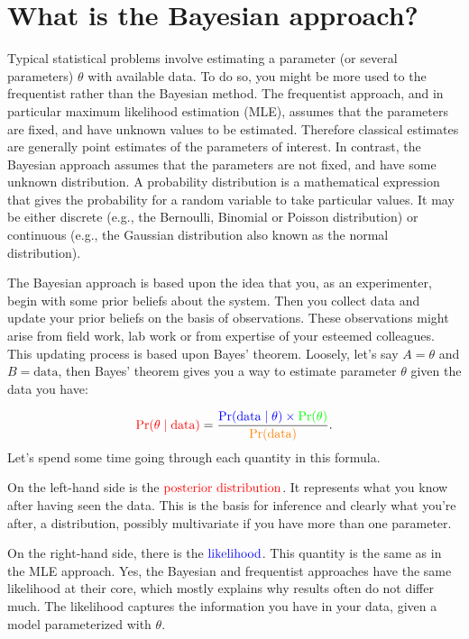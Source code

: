 \documentclass[
  12pt,
]{krantz}
\begin{document}
\section{What is the Bayesian approach?}\label{what-is-the-bayesian-approach}

Typical statistical problems involve estimating a parameter (or several parameters) \(\theta\) with available data. To do so, you might be more used to the frequentist rather than the Bayesian method. The frequentist approach, and in particular maximum likelihood estimation (MLE), assumes that the parameters are fixed, and have unknown values to be estimated. Therefore classical estimates are generally point estimates of the parameters of interest. In contrast, the Bayesian approach assumes that the parameters are not fixed, and have some unknown distribution. A probability distribution is a mathematical expression that gives the probability for a random variable to take particular values. It may be either discrete (e.g., the Bernoulli, Binomial or Poisson distribution) or continuous (e.g., the Gaussian distribution also known as the normal distribution).

The Bayesian approach is based upon the idea that you, as an experimenter, begin with some prior beliefs about the system. Then you collect data and update your prior beliefs on the basis of observations. These observations might arise from field work, lab work or from expertise of your esteemed colleagues. This updating process is based upon Bayes' theorem. Loosely, let's say \(A = \theta\) and \(B = \text{data}\), then Bayes' theorem gives you a way to estimate parameter \(\theta\) given the data you have:

\[{\color{red}{\Pr(\theta \mid \text{data})}} = \frac{\color{blue}{\Pr(\text{data} \mid \theta)} \times \color{green}{\Pr(\theta)}}{\color{orange}{\Pr(\text{data})}}.\]
Let's spend some time going through each quantity in this formula.

On the left-hand side is the \(\color{red}{\text{posterior distribution}}\). It represents what you know after having seen the data. This is the basis for inference and clearly what you're after, a distribution, possibly multivariate if you have more than one parameter.

On the right-hand side, there is the \(\color{blue}{\text{likelihood}}\). This quantity is the same as in the MLE approach. Yes, the Bayesian and frequentist approaches have the same likelihood at their core, which mostly explains why results often do not differ much. The likelihood captures the information you have in your data, given a model parameterized with \(\theta\).
\end{document}
